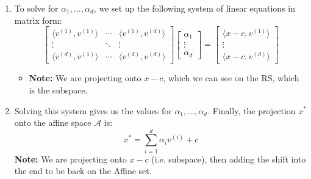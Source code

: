 \begin{derivation}
\begin{enumerate}
                \item To solve for $\alpha_1, \dots, \alpha_d$, we set up the following system of linear equations in matrix form:
                \[
                \begin{bmatrix}
                \langle v^{(1)}, v^{(1)} \rangle & \cdots & \langle v^{(1)}, v^{(d)} \rangle \\
                \vdots & \ddots & \vdots \\
                \langle v^{(d)}, v^{(1)} \rangle & \cdots & \langle v^{(d)}, v^{(d)} \rangle
                \end{bmatrix}
                \begin{bmatrix}
                \alpha_1 \\
                \vdots \\
                \alpha_d
                \end{bmatrix}
                =
                \begin{bmatrix}
                \langle x - c, v^{(1)} \rangle \\
                \vdots \\
                \langle x - c, v^{(d)} \rangle
                \end{bmatrix}
                \]
                \begin{itemize}
                    \item \textbf{Note:} We are projecting onto $x-c$, which we can see on the RS, which is the subspace.
                \end{itemize}
            
                \item Solving this system gives us the values for $\alpha_1, \dots, \alpha_d$. Finally, the projection $x^*$ onto the affine space $\mathcal{A}$ is:
                \[
                x^* = \sum_{i=1}^{d} \alpha_i v^{(i)} + c
                \]
                \textbf{Note:} We are projecting onto $x-c$ (i.e. subspace), then adding the shift into the end to be back on the Affine set.
            \end{enumerate}
        \end{derivation}

